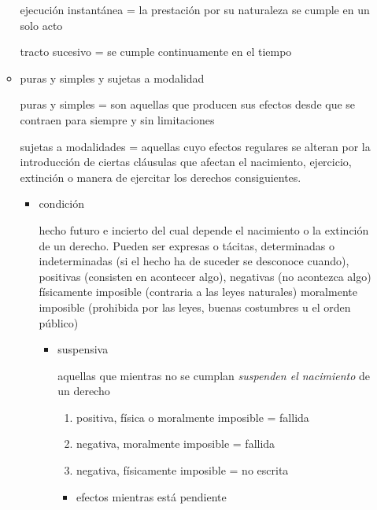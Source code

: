 \documentclass[]{article}
\providecommand{\tightlist}{%
  \setlength{\itemsep}{0pt}\setlength{\parskip}{0pt}}
\begin{document}
\begin{itemize}
\begin{itemize}
    ejecución instantánea = la prestación por su naturaleza se cumple en
    un solo acto

    tracto sucesivo = se cumple continuamente en el tiempo
  \item
    puras y simples y sujetas a modalidad

    puras y simples = son aquellas que producen sus efectos desde que se
    contraen para siempre y sin limitaciones

    sujetas a modalidades = aquellas cuyo efectos regulares se alteran
    por la introducción de ciertas cláusulas que afectan el nacimiento,
    ejercicio, extinción o manera de ejercitar los derechos
    consiguientes.

    \begin{itemize}
    \item
      condición

      hecho futuro e incierto del cual depende el nacimiento o la
      extinción de un derecho. Pueden ser expresas o tácitas,
      determinadas o indeterminadas (si el hecho ha de suceder se
      desconoce cuando), positivas (consisten en acontecer algo),
      negativas (no acontezca algo) físicamente imposible (contraria a
      las leyes naturales) moralmente imposible (prohibida por las
      leyes, buenas costumbres u el orden público)

      \begin{itemize}
      \item
        suspensiva

        aquellas que mientras no se cumplan \emph{suspenden el
        nacimiento} de un derecho

        \begin{enumerate}
        \def\labelenumi{\arabic{enumi}.}
        \tightlist
        \item
          positiva, física o moralmente imposible = fallida
        \item
          negativa, moralmente imposible = fallida
        \item
          negativa, físicamente imposible = no escrita
        \end{enumerate}

        \begin{itemize}
        \item
          efectos mientras está pendiente


\end{itemize}
\end{itemize}
\end{itemize}
\end{itemize}
\end{itemize}
\end{document}
